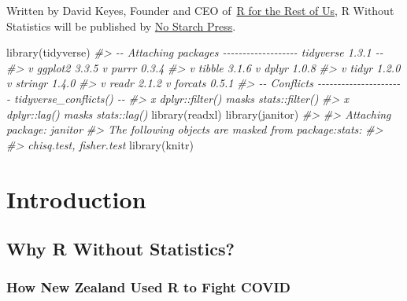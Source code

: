 \documentclass[
]{book}
\newenvironment{Shaded}{\begin{snugshade}}{\end{snugshade}}
\newcommand{\CommentTok}[1]{\textcolor[rgb]{0.56,0.35,0.01}{\textit{#1}}}
\newcommand{\FunctionTok}[1]{\textcolor[rgb]{0.00,0.00,0.00}{#1}}
\newcommand{\NormalTok}[1]{#1}
\begin{document}
Written by David Keyes, Founder and CEO of~\href{https://rfortherestofus.com/}{R for the Rest of Us}, R Without Statistics will be published by \href{https://nostarch.com/}{No Starch Press}.

\begin{Shaded}
\begin{Highlighting}[]
\FunctionTok{library}\NormalTok{(tidyverse)}
\CommentTok{\#\textgreater{} {-}{-} Attaching packages {-}{-}{-}{-}{-}{-}{-}{-}{-}{-}{-}{-}{-}{-}{-}{-}{-}{-}{-} tidyverse 1.3.1 {-}{-}}
\CommentTok{\#\textgreater{} v ggplot2 3.3.5     v purrr   0.3.4}
\CommentTok{\#\textgreater{} v tibble  3.1.6     v dplyr   1.0.8}
\CommentTok{\#\textgreater{} v tidyr   1.2.0     v stringr 1.4.0}
\CommentTok{\#\textgreater{} v readr   2.1.2     v forcats 0.5.1}
\CommentTok{\#\textgreater{} {-}{-} Conflicts {-}{-}{-}{-}{-}{-}{-}{-}{-}{-}{-}{-}{-}{-}{-}{-}{-}{-}{-}{-}{-}{-} tidyverse\_conflicts() {-}{-}}
\CommentTok{\#\textgreater{} x dplyr::filter() masks stats::filter()}
\CommentTok{\#\textgreater{} x dplyr::lag()    masks stats::lag()}
\FunctionTok{library}\NormalTok{(readxl)}
\FunctionTok{library}\NormalTok{(janitor)}
\CommentTok{\#\textgreater{} }
\CommentTok{\#\textgreater{} Attaching package: \textquotesingle{}janitor\textquotesingle{}}
\CommentTok{\#\textgreater{} The following objects are masked from \textquotesingle{}package:stats\textquotesingle{}:}
\CommentTok{\#\textgreater{} }
\CommentTok{\#\textgreater{}     chisq.test, fisher.test}
\FunctionTok{library}\NormalTok{(knitr)}
\end{Highlighting}
\end{Shaded}

\hypertarget{part-introduction}{%
\part*{Introduction}\label{part-introduction}}

\hypertarget{why-r-without-statistics}{%
\chapter*{Why R Without Statistics?}\label{why-r-without-statistics}}

\hypertarget{how-new-zealand-used-r-to-fight-covid}{%
\section*{How New Zealand Used R to Fight COVID}\label{how-new-zealand-used-r-to-fight-covid}}
\end{document}
